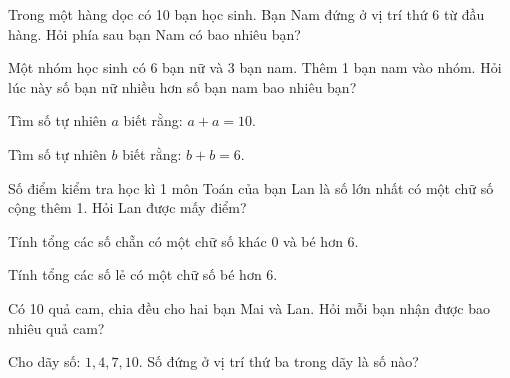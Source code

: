 \begin{ex}
Trong một hàng dọc có 10 bạn học sinh. Bạn Nam đứng ở vị trí thứ 6 từ đầu hàng. Hỏi phía sau bạn Nam có bao nhiêu bạn?
\end{ex}

\begin{ex}
Một nhóm học sinh có 6 bạn nữ và 3 bạn nam. Thêm 1 bạn nam vào nhóm. Hỏi lúc này số bạn nữ nhiều hơn số bạn nam bao nhiêu bạn?
\end{ex}

\begin{ex}
Tìm số tự nhiên $a$ biết rằng: $a + a = 10$.
\end{ex}

\begin{ex}
Tìm số tự nhiên $b$ biết rằng: $b + b = 6$.
\end{ex}

\begin{ex}
Số điểm kiểm tra học kì 1 môn Toán của bạn Lan là số lớn nhất có một chữ số cộng thêm 1. Hỏi Lan được mấy điểm?
\end{ex}

\begin{ex}
Tính tổng các số chẵn có một chữ số khác 0 và bé hơn 6.
\end{ex}

\begin{ex}
Tính tổng các số lẻ có một chữ số bé hơn 6.
\end{ex}

\begin{ex}
Có 10 quả cam, chia đều cho hai bạn Mai và Lan. Hỏi mỗi bạn nhận được bao nhiêu quả cam?
\end{ex}

\begin{ex}
Cho dãy số: $1, 4, 7, 10$. Số đứng ở vị trí thứ ba trong dãy là số nào?
\end{ex}
